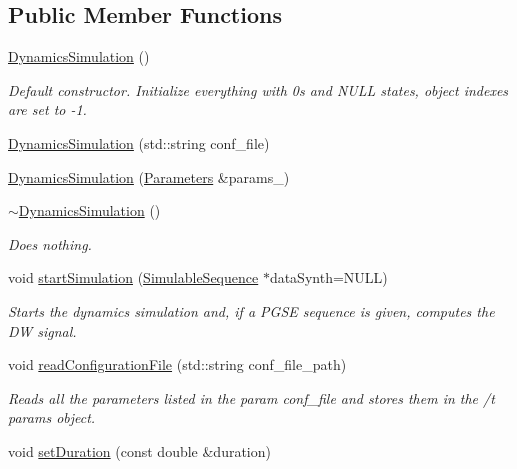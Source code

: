 \subsection*{Public Member Functions}
\begin{DoxyCompactItemize}
\item 
\hyperlink{class_dynamics_simulation_ad9a3e1f235466c3827cb49c67d3a6147}{Dynamics\+Simulation} ()
\begin{DoxyCompactList}\small\item\em Default constructor. Initialize everything with 0\textquotesingle{}s and N\+U\+LL states, object indexes are set to -\/1. \end{DoxyCompactList}\item 
\hyperlink{class_dynamics_simulation_aa603b5ba682b1b37cc96dd8be113cb52}{Dynamics\+Simulation} (std\+::string conf\+\_\+file)
\item 
\hyperlink{class_dynamics_simulation_a8fd2ec6f3640bff79e4b1ad960bbda5b}{Dynamics\+Simulation} (\hyperlink{class_parameters}{Parameters} \&params\+\_\+)
\item 
\mbox{\label{class_dynamics_simulation_a15a1f18a99d606ef2ca939e718ca996f}} 
\hyperlink{class_dynamics_simulation_a15a1f18a99d606ef2ca939e718ca996f}{$\sim$\+Dynamics\+Simulation} ()
\begin{DoxyCompactList}\small\item\em Does nothing. \end{DoxyCompactList}\item 
void \hyperlink{class_dynamics_simulation_a820ee541ac42b1f9d08f5aef571eccc7}{start\+Simulation} (\hyperlink{class_simulable_sequence}{Simulable\+Sequence} $\ast$data\+Synth=N\+U\+LL)
\begin{DoxyCompactList}\small\item\em Starts the dynamics simulation and, if a P\+G\+SE sequence is given, computes the DW signal. \end{DoxyCompactList}\item 
void \hyperlink{class_dynamics_simulation_a67adab75eba635447c1b1b2b26d1e0ab}{read\+Configuration\+File} (std\+::string conf\+\_\+file\+\_\+path)
\begin{DoxyCompactList}\small\item\em Reads all the parameters listed in the param conf\+\_\+file and stores them in the /t params object. \end{DoxyCompactList}\item 
void \hyperlink{class_dynamics_simulation_a9148a30590bef5c766fd2366bbd16eb8}{set\+Duration} (const double \&duration)

\end{DoxyCompactItemize}
